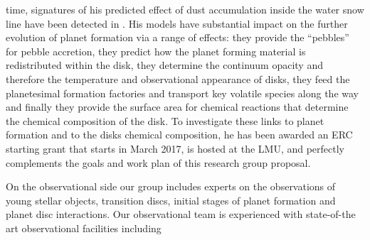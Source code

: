 \documentclass[12pt]{article}
\begin{document}
time, signatures of his predicted effect of dust accumulation inside the water
snow line \citet{2010A&A...513A..79B} have been detected in
\citet{2016Natur.535..258C}. His models have substantial impact on the further
evolution of planet formation via a range of effects: they provide the
``pebbles'' for pebble accretion, they predict how the planet forming material
is redistributed within the disk, they determine the continuum opacity and
therefore the temperature and observational appearance of disks, they feed the
planetesimal formation factories and transport key volatile species along the
way and finally they provide the surface area for chemical reactions that determine the
chemical composition of the disk. To investigate these links to planet formation
and to the disks chemical composition, he has been awarded an ERC starting grant
that starts in March 2017, is hosted at the LMU, and perfectly complements
the goals and work plan of this research group proposal.

 On the observational side our group includes experts on the
 observations of young stellar objects, transition discs, initial stages of
 planet formation and planet disc interactions. Our observational
 team is experienced with state-of-the art observational facilities
 including 
\end{document}
